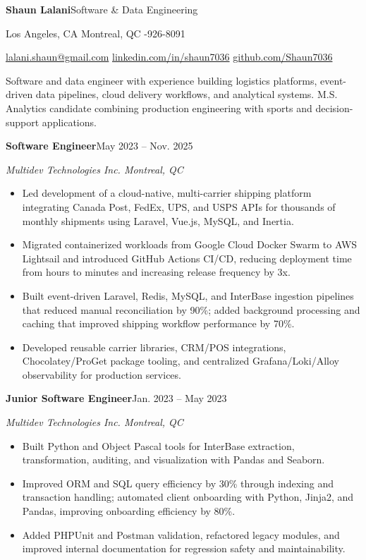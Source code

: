 \documentclass[10pt,letterpaper]{article}
\newcommand{\resumesection}[1]{\vspace{5pt}{\large\bfseries\color{accent}#1}\par\vspace{1pt}{\color{accent}\hrule}\vspace{3pt}}
\begin{document}
\color{ink}
{\Huge\bfseries Shaun Lalani}\hfill{\large Software \& Data Engineering}\par
Los Angeles, CA \enspace\textbar\enspace Montreal, QC \enspace\textbar{}-926-8091\par
\href{mailto:lalani.shaun@gmail.com}{lalani.shaun@gmail.com} \enspace\textbar\enspace
\href{https://www.linkedin.com/in/shaun7036/}{linkedin.com/in/shaun7036} \enspace\textbar\enspace
\href{https://github.com/Shaun7036}{github.com/Shaun7036}

\resumesection{Profile}
Software and data engineer with experience building logistics platforms, event-driven data pipelines, cloud delivery workflows, and analytical systems. M.S. Analytics candidate combining production engineering with sports and decision-support applications.

\resumesection{Experience}
\textbf{Software Engineer}\hfill May 2023 -- Nov. 2025\par
\textit{Multidev Technologies Inc. \enspace\textbar\enspace Montreal, QC}
\begin{itemize}
\item Led development of a cloud-native, multi-carrier shipping platform integrating Canada Post, FedEx, UPS, and USPS APIs for thousands of monthly shipments using Laravel, Vue.js, MySQL, and Inertia.
\item Migrated containerized workloads from Google Cloud Docker Swarm to AWS Lightsail and introduced GitHub Actions CI/CD, reducing deployment time from hours to minutes and increasing release frequency by 3x.
\item Built event-driven Laravel, Redis, MySQL, and InterBase ingestion pipelines that reduced manual reconciliation by 90\%; added background processing and caching that improved shipping workflow performance by 70\%.
\item Developed reusable carrier libraries, CRM/POS integrations, Chocolatey/ProGet package tooling, and centralized Grafana/Loki/Alloy observability for production services.
\end{itemize}

\textbf{Junior Software Engineer}\hfill Jan. 2023 -- May 2023\par
\textit{Multidev Technologies Inc. \enspace\textbar\enspace Montreal, QC}
\begin{itemize}
\item Built Python and Object Pascal tools for InterBase extraction, transformation, auditing, and visualization with Pandas and Seaborn.
\item Improved ORM and SQL query efficiency by 30\% through indexing and transaction handling; automated client onboarding with Python, Jinja2, and Pandas, improving onboarding efficiency by 80\%.
\item Added PHPUnit and Postman validation, refactored legacy modules, and improved internal documentation for regression safety and maintainability.
\end{itemize}
\end{document}
